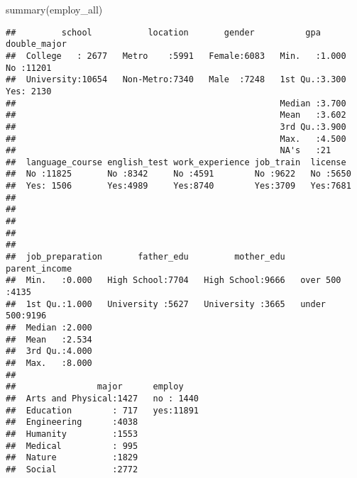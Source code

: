 \documentclass[
]{book}
\newenvironment{Shaded}{\begin{snugshade}}{\end{snugshade}}
\newcommand{\FunctionTok}[1]{\textcolor[rgb]{0.00,0.00,0.00}{#1}}
\newcommand{\NormalTok}[1]{#1}
\begin{document}
\begin{Shaded}
\begin{Highlighting}[]
\FunctionTok{summary}\NormalTok{(employ\_all)}
\end{Highlighting}
\end{Shaded}

\begin{verbatim}
##         school           location       gender          gpa        double_major
##  College   : 2677   Metro    :5991   Female:6083   Min.   :1.000   No :11201   
##  University:10654   Non-Metro:7340   Male  :7248   1st Qu.:3.300   Yes: 2130   
##                                                    Median :3.700               
##                                                    Mean   :3.602               
##                                                    3rd Qu.:3.900               
##                                                    Max.   :4.500               
##                                                    NA's   :21                  
##  language_course english_test work_experience job_train  license   
##  No :11825       No :8342     No :4591        No :9622   No :5650  
##  Yes: 1506       Yes:4989     Yes:8740        Yes:3709   Yes:7681  
##                                                                    
##                                                                    
##                                                                    
##                                                                    
##                                                                    
##  job_preparation       father_edu         mother_edu     parent_income 
##  Min.   :0.000   High School:7704   High School:9666   over 500 :4135  
##  1st Qu.:1.000   University :5627   University :3665   under 500:9196  
##  Median :2.000                                                         
##  Mean   :2.534                                                         
##  3rd Qu.:4.000                                                         
##  Max.   :8.000                                                         
##                                                                        
##                major      employ     
##  Arts and Physical:1427   no : 1440  
##  Education        : 717   yes:11891  
##  Engineering      :4038              
##  Humanity         :1553              
##  Medical          : 995              
##  Nature           :1829              
##  Social           :2772
\end{verbatim}
\end{document}
